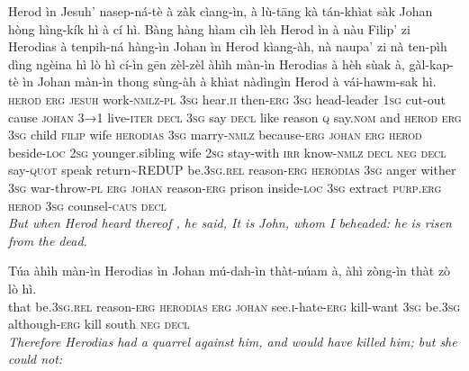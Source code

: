 \documentclass[11pt,a4paper]{article}
\begin{document}
\begin{exe}
\gll Herod ìn Jesuh' nasep-ná-tè à zàk cìang-ìn, à lù-tāng kà tán-khìat sàk Johan hòng hìng-kík hì à cí hì. Bàng hàng hìam cìh lèh Herod ìn à nàu Filip' zi Herodias à tenpih-ná hàng-ìn Johan ìn Herod kìang-àh, nà naupa' zi nà ten-pìh dìng ngèina hì lò hì cí-ìn gēn zèl-zèl àhìh màn-ìn Herodias à hèh sùak à, gàl-kap-tè ìn Johan màn-ìn thong sùng-àh à khìat nàdìngìn Herod à vái-hawm-sak hì. \\
     \textsc{herod} \textsc{erg} \textsc{jesuh} work-\textsc{nmlz}-\textsc{pl} \textsc{3sg} hear.\textsc{ii} then-\textsc{erg} \textsc{3sg} head-leader \textsc{1sg} cut-out cause \textsc{johan} \textsc{3→1} live-\textsc{iter} \textsc{decl} \textsc{3sg} say \textsc{decl} like reason \textsc{q} say.\textsc{nom} and \textsc{herod} \textsc{erg} \textsc{3sg} child \textsc{filip} wife \textsc{herodias} \textsc{3sg} marry-\textsc{nmlz} because-\textsc{erg} \textsc{johan} \textsc{erg} \textsc{herod} beside-\textsc{loc} \textsc{2sg} younger.sibling wife \textsc{2sg} stay-with \textsc{irr} know-\textsc{nmlz} \textsc{decl} \textsc{neg} \textsc{decl} say-\textsc{quot} speak return\textasciitilde{}REDUP be.\textsc{3sg}.\textsc{rel} reason-\textsc{erg} \textsc{herodias} \textsc{3sg} anger wither \textsc{3sg} war-throw-\textsc{pl} \textsc{erg} \textsc{johan} reason-\textsc{erg} prison inside-\textsc{loc} \textsc{3sg} extract \textsc{purp}.\textsc{erg} \textsc{herod} \textsc{3sg} counsel-\textsc{caus} \textsc{decl} \\
\glt \textcolor{kjvcolor}{\textit{But when Herod heard thereof , he said, It is John, whom I beheaded: he is risen from the dead.}}

\gll Túa àhìh màn-ìn Herodias ìn Johan mú-dah-ìn thàt-núam à, àhì zòng-ìn thàt zò lò hì. \\
     that be.\textsc{3sg}.\textsc{rel} reason-\textsc{erg} \textsc{herodias} \textsc{erg} \textsc{johan} see.\textsc{i}-hate-\textsc{erg} kill-want \textsc{3sg} be.\textsc{3sg} although-\textsc{erg} kill south \textsc{neg} \textsc{decl} \\
\glt \textcolor{kjvcolor}{\textit{Therefore Herodias had a quarrel against him, and would have killed him; but she could not:}}


\end{exe}
\end{document}
